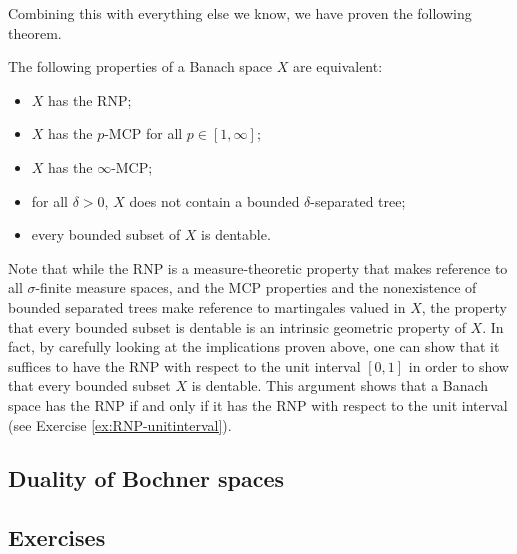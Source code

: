   Combining this with everything else we know, we have proven the following theorem.
  \begin{thm}
    The following properties of a Banach space $X$ are equivalent:
    \begin{itemize}
    \item $X$ has the RNP;
    \item $X$ has the $p$-MCP for all $p \in [1,\infty]$;
    \item $X$ has the $\infty$-MCP;
    \item for all $\delta > 0$, $X$ does not contain a bounded $\delta$-separated tree;
    \item every bounded subset of $X$ is dentable.
    \end{itemize}
  \end{thm}

  Note that while the RNP is a measure-theoretic property that makes reference to all $\sigma$-finite measure spaces, and the MCP properties and the nonexistence of bounded separated trees make reference to martingales valued in $X$, the property that every bounded subset is dentable is an intrinsic geometric property of $X$.
  In fact, by carefully looking at the implications proven above, one can show that it suffices to have the RNP with respect to the unit interval $[0,1]$ in order to show that every bounded subset $X$ is dentable.
  This argument shows that a Banach space has the RNP if and only if it has the RNP with respect to the unit interval (see Exercise \ref{ex:RNP-unitinterval}).

\subsection{Duality of Bochner spaces}


\subsection*{Exercises}


